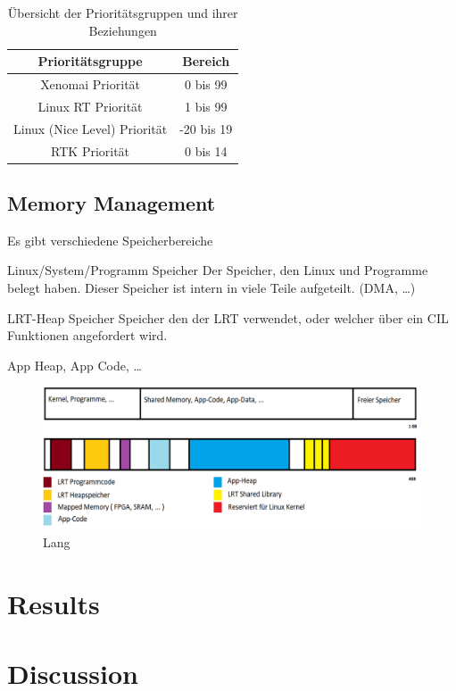 \documentclass[MMR,Master,english]{twbook}
\begin{document}
\begin{table}[ht]
    \centering
    \caption{Übersicht der Prioritätsgruppen und ihrer Beziehungen}
    \label{tab:priorities}
    \begin{tabular}{|c|c|}
        \hline
        \textbf{Prioritätsgruppe} & \textbf{Bereich}  \\ \hline
        Xenomai Priorität & 0 bis 99  \\ \hline
        Linux RT Priorität & 1 bis 99 \\ \hline
        Linux (Nice Level) Priorität & -20 bis 19  \\ \hline
        RTK Priorität & 0 bis 14 \\ \hline
    \end{tabular}

\end{table}
 



\section{Memory Management}
Es gibt verschiedene Speicherbereiche

Linux/System/Programm Speicher
	Der Speicher, den Linux und Programme belegt haben.
	Dieser Speicher ist intern in viele Teile aufgeteilt. (DMA, …)

LRT-Heap Speicher
	Speicher den der LRT verwendet, oder welcher über ein CIL Funktionen
	angefordert wird.

App Heap, App Code, …


\begin{figure}[!h]
    \centering
    \includegraphics[width=0.8\columnwidth]{img/RAM_Memory_management.png}
    \caption[Kurz]{Lang}
    \label{fig:memory_management}
  \end{figure}

 
\clearpage
\chapter{Results}
\clearpage
\chapter{Discussion}
\clearpage
\end{document}
